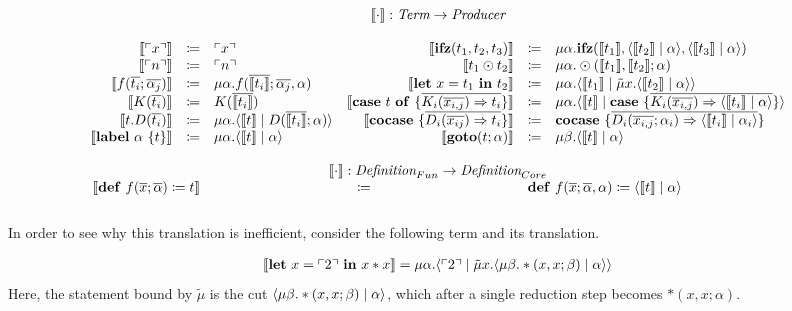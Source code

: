 \[
  \begin{array}{rcl rcl}
    \multicolumn{6}{c}{\translate{\cdot} : \emph{Term} \rightarrow \emph{Producer}}\\
    \\
    \translate{\lit{x}} & \coloneq & \lit{x} & 
    \translate{\ifz{t_1}{t_2}{t_3}} & \coloneq & \mu\alpha.\ifz{\translate{t_1}}{\cut{\translate{t_2}}{\alpha}}{\cut{\translate{t_3}}{\alpha}} \\
    \translate{\lit{n}} & \coloneq & \lit{n}  &  
    \translate{t_1 \odot t_2} & \coloneq & \mu\alpha.\odot(\translate{t_1}, \translate{t_2}; \alpha)  \\
    \translate{f(\overline{t_i}; \overline{\alpha_j})} & \coloneq & \mu\alpha.f(\overline{\translate{t_i}}; \overline{\alpha_j},\alpha)  & 
    \translate{\letin{x}{t_1}{t_2}} & \coloneq & \mu\alpha.\cut{\translate{t_1}}{\tilde{\mu}x.\cut{\translate{t_2}}{\alpha}} \\
    \translate{K(\overline{t_i})} & \coloneq & K(\overline{\translate{t_i}}) &  
    \translate{\caseof{t}{\overline{K_i(\overline{x_{i,j}}) \Rightarrow t_i}}} & \coloneq & \mu\alpha.\cut{\translate{t}}{\case{\overline{K_i(\overline{x_{i,j}}) \Rightarrow \cut{\translate{t_i}}{\alpha}}}}  \\
    \translate{t.D(\overline{t_i})} & \coloneq & \mu\alpha.\cut{\translate{t}}{D(\overline{\translate{t_i}}; \alpha)}   & 
    \translate{\cocase{\overline{D_i(\overline{x_{ij}})\Rightarrow t_i}}} & \coloneq & \cocase{\overline{D_i(\overline{x_{i,j}}; \alpha_i) \Rightarrow \cut{\translate{t_i}}{\alpha_i}}}  \\
    \translate{\lab{\alpha}{t}} & \coloneq & \mu\alpha.\cut{\translate{t}}{\alpha} & 
    \translate{\goto{t}{\alpha}} & \coloneq & \mu\beta.\cut{\translate{t}}{\alpha}  \\
    \\
    \multicolumn{6}{c}{\translate{\cdot{}}{} : \emph{Definition}_{Fun} \rightarrow \emph{Definition}_{Core}}\\
    \multicolumn{2}{r}{\translate{\defi{f(\overline{x}; \overline{\alpha})}{t}}{}} & \multicolumn{2}{c}{\coloneq} & \multicolumn{2}{l}{\defi{f(\overline{x}; \overline{\alpha}, \alpha)}{\cut{\translate{t}}{\alpha}}} \\
    \\
  \end{array}
\]
In order to see why this translation is inefficient, consider the following term and its translation.
\begin{example}
  \label{ex:translation_naive}
  \begin{align*}
    \llbracket \mathbf{let}\ x = \ulcorner 2 \urcorner\ \mathbf{in}\ x*x \rrbracket = \mu\alpha.\langle \ulcorner 2 \urcorner \mid \tilde\mu x.\langle \mu\beta.*(x,x;\beta) \mid \alpha \rangle \rangle
  \end{align*}
  Here, the statement bound by $\tilde\mu$ is the cut $\langle \mu\beta.*(x,x;\beta) \mid \alpha \rangle$, which after a single reduction step becomes $*(x,x;\alpha)$.
\end{example}
